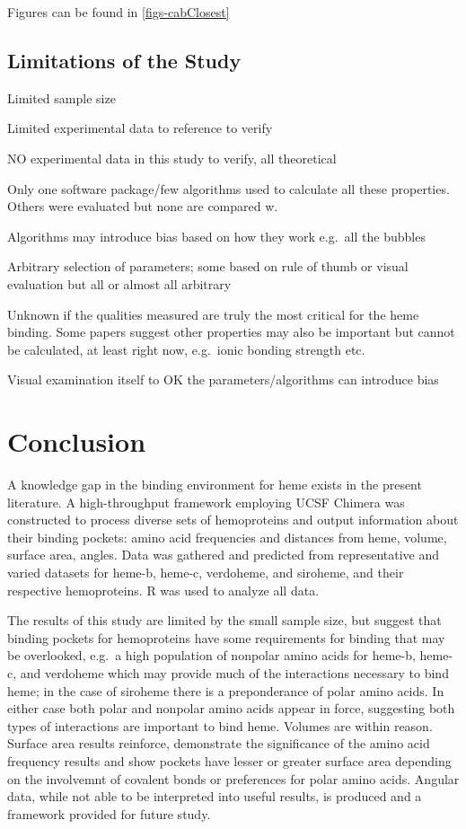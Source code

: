 \documentclass[a4paper, nobind]{templates/ociamthesis}
\begin{document}
Figures can be found in \ref{figs-cabClosest}

\hypertarget{limitations-of-the-study}{%
\section{Limitations of the Study}\label{limitations-of-the-study}}

Limited sample size

Limited experimental data to reference to verify

NO experimental data in this study to verify, all theoretical

Only one software package/few algorithms used to calculate all these properties. Others were evaluated but none are compared w.

Algorithms may introduce bias based on how they work e.g.~all the bubbles

Arbitrary selection of parameters; some based on rule of thumb or visual evaluation but all or almost all arbitrary

Unknown if the qualities measured are truly the most critical for the heme binding. Some papers suggest other properties may also be important but cannot be calculated, at least right now, e.g.~ionic bonding strength etc.

Visual examination itself to OK the parameters/algorithms can introduce bias

\adjustmtc
{}

\hypertarget{conclusion}{%
\chapter{Conclusion}\label{conclusion}}

A knowledge gap in the binding environment for heme exists in the present literature. A high-throughput framework employing UCSF Chimera was constructed to process diverse sets of hemoproteins and output information about their binding pockets: amino acid frequencies and distances from heme, volume, surface area, angles. Data was gathered and predicted from representative and varied datasets for heme-b, heme-c, verdoheme, and siroheme, and their respective hemoproteins. R was used to analyze all data.

The results of this study are limited by the small sample size, but suggest that binding pockets for hemoproteins have some requirements for binding that may be overlooked, e.g.~a high population of nonpolar amino acids for heme-b, heme-c, and verdoheme which may provide much of the interactions necessary to bind heme; in the case of siroheme there is a preponderance of polar amino acids. In either case both polar and nonpolar amino acids appear in force, suggesting both types of interactions are important to bind heme. Volumes are within reason. Surface area results reinforce, demonstrate the significance of the amino acid frequency results and show pockets have lesser or greater surface area depending on the involvemnt of covalent bonds or preferences for polar amino acids. Angular data, while not able to be interpreted into useful results, is produced and a framework provided for future study.
\end{document}
